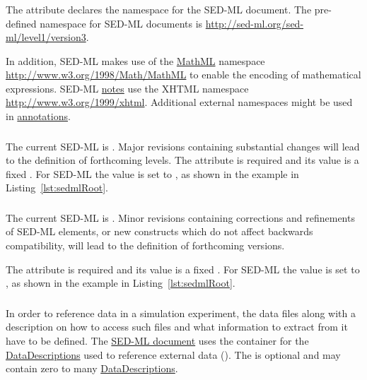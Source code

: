\subsubsection{}
\label{sec:xmlns}
The  attribute declares the namespace for the SED-ML document. The pre-defined namespace for SED-ML documents is \url{http://sed-ml.org/sed-ml/level1/version3}. 

In addition, SED-ML makes use of the \hyperref[sec:mathML]{MathML} namespace \url{http://www.w3.org/1998/Math/MathML} to enable the encoding of mathematical expressions. SED-ML \hyperref[class:notes]{notes} use the XHTML namespace \url{http://www.w3.org/1999/xhtml}. Additional external namespaces might be used in \hyperref[class:annotation]{annotations}.

\subsubsection{}
\label{sec:level}
The current SED-ML  is \code{\level}. Major revisions containing substantial changes will lead to the definition of forthcoming levels. The  attribute is required and its value is a fixed . For SED-ML \currentLV the value is set to \code{\level}, as shown in the example in Listing~\ref{lst:sedmlRoot}.

\subsubsection{}
\label{sec:version}
The current SED-ML  is \code{\version}. Minor revisions containing corrections and refinements of SED-ML elements, or new constructs which do not affect backwards compatibility, will lead to the definition of forthcoming versions.

The  attribute is required and its value is a fixed . For SED-ML \currentLV the value is set to \code{\version}, as shown in the example in Listing~\ref{lst:sedmlRoot}.

\subsubsection{}
\label{sec:listOfDataDescriptions}
In order to reference data in a simulation experiment, the data files along with a description on how to access such files and what information to extract from it have to be defined. The \hyperref[class:sed-ml]{SED-ML document} uses the  container for the \hyperref[class:dataDescription]{DataDescriptions} used to reference external data (). The  is optional and may contain zero to many \hyperref[class:dataDescription]{DataDescriptions}.

